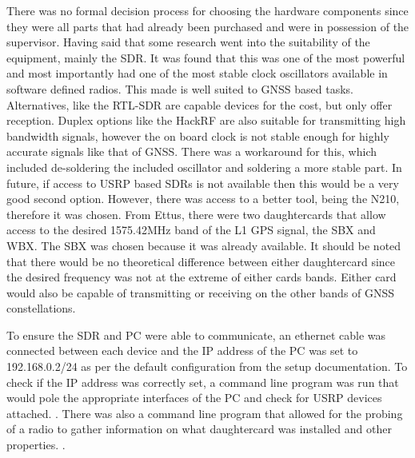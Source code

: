 There was no formal decision process for choosing the hardware components since they were all parts that had already been purchased and were in possession of the
supervisor. Having said that some research went into the suitability of the equipment, mainly the SDR. It was found that this was one of the most powerful and most
importantly had one of the most stable clock oscillators available in software defined radios. This made is well suited to GNSS based tasks. Alternatives, like the
RTL-SDR are capable devices for the cost, but only offer reception. Duplex options like the HackRF are also suitable for transmitting high bandwidth signals, however the
on board clock is not stable enough for highly accurate signals like that of GNSS. There was a workaround for this, which included de-soldering the included oscillator and
soldering a more stable part. In future, if access to USRP based SDRs is not available then this would be a very good second option. However, there was access to a better
tool, being the N210, therefore it was chosen. From Ettus, there were two daughtercards that allow access to the desired 1575.42MHz band of the L1 GPS signal, the SBX and
WBX. The SBX was chosen because it was already available. It should be noted that there would be no theoretical difference between either daughtercard since the desired
frequency was not at the extreme of either cards bands. Either card would also be capable of transmitting or receiving on the other bands of GNSS constellations.

To ensure the SDR and PC were able to communicate, an ethernet cable was connected between each device and the IP address of the PC was set to 192.168.0.2/24 as per the
default configuration from the setup documentation. To check if the IP address was correctly set, a command line program was run that would pole the appropriate
interfaces of the PC and check for USRP devices attached. . There was also a command line program that allowed for the probing of a
radio to gather information on what daughtercard was installed and other properties. .

